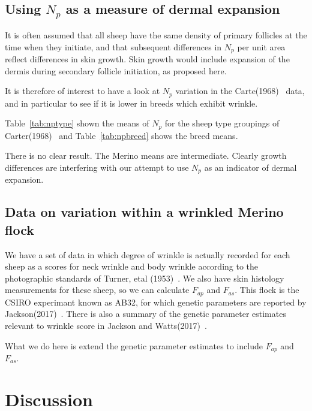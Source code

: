 \documentclass[titlepage]{article}  %
\begin{document}
\subsection{Using $N_{p}$ as a measure of dermal expansion}
It is often assumed that all sheep have the same density of primary follicles at the time when they initiate, and that subsequent differences in $N_{p}$ per unit area reflect differences in skin growth. Skin growth would include expansion of the dermis during secondary follicle initiation, as proposed here. 

It is therefore of interest to have a look at $N_{p}$ variation in the Carte(1968)~\cite{cart:68} data, and in particular to see if it is lower in breeds which exhibit wrinkle. 

Table~\ref{tab:nptype} shown the means of $N_{p}$ for the sheep type groupings of Carter(1968)~\cite{cart:68} and Table~\ref{tab:npbreed} shows the breed means. 


There is no clear result. The Merino means are intermediate. Clearly growth differences are interfering with our attempt to use $N_{p}$ as an indicator of dermal expansion.

\subsection{Data on variation within a wrinkled Merino flock}
We have a set of data in which degree of wrinkle is actually recorded for each sheep as a scores for neck wrinkle and body wrinkle according to the photographic standards of Turner, etal (1953)~\cite{turn:53}. We also have skin histology measurements for these sheep, so we can calculate $F_{ap}$ and $F_{as}$. This flock is the CSIRO experimant known as AB32, for which genetic parameters are reported by Jackson(2017)~\cite{jack:17a}. There is also a summary of the genetic parameter estimates relevant to wrinkle score in Jackson and Watts(2017)~\cite{jack:17b}.

What we do here is extend the genetic parameter estimates to include $F_{ap}$ and $F_{as}$. 


\clearpage
\section{Discussion}
\end{document}
